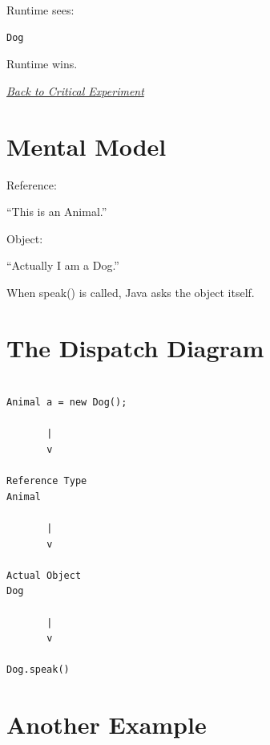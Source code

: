 \documentclass[11pt,a4paper]{book}
\begin{document}
Runtime sees:

\begin{verbatim}
Dog
\end{verbatim}


Runtime wins.

\smallskip
\noindent
\hyperref[sec:dynamic_dispatch_experiment]{\emph{Back to Critical Experiment}}


\section{Mental Model}

\begin{mentalmodel}

Reference:

``This is an Animal.''

Object:

``Actually I am a Dog.''

When speak() is called,
Java asks the object itself.

\end{mentalmodel}


\section{The Dispatch Diagram}

\begin{verbatim}

Animal a = new Dog();

       |
       v

Reference Type
Animal

       |
       v

Actual Object
Dog

       |
       v

Dog.speak()

\end{verbatim}


\section{Another Example}
\end{document}
